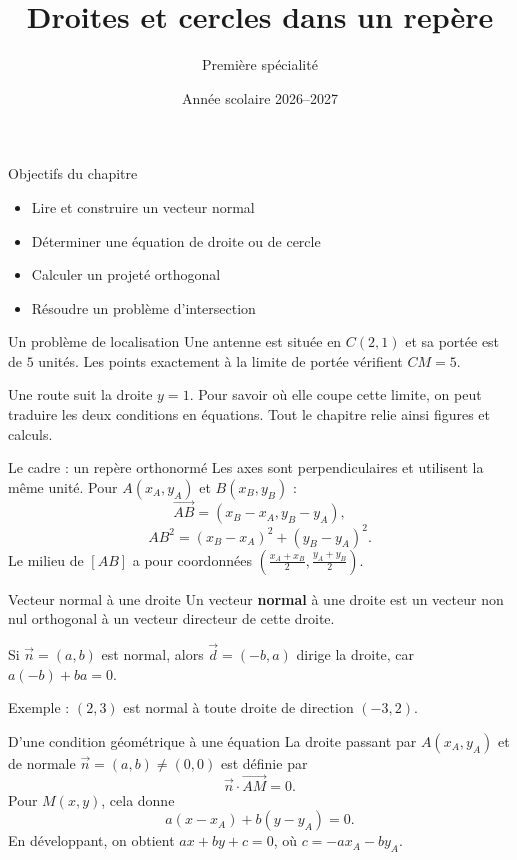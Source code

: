 \documentclass[aspectratio=169,12pt]{beamer}
\title{Droites et cercles dans un repère}
\subtitle{Première spécialité}
\date{Année scolaire 2026--2027}
\begin{document}
\begin{frame}\titlepage\end{frame}
\begin{frame}{Objectifs du chapitre}\begin{itemize}
\item Lire et construire un vecteur normal
\item Déterminer une équation de droite ou de cercle
\item Calculer un projeté orthogonal
\item Résoudre un problème d’intersection
\end{itemize}\end{frame}
\renewcommand{\slidekind}{COMPRENDRE}
\begin{frame}[t,fragile]{Un problème de localisation}
Une antenne est située en $C(2,1)$ et sa portée est de $5$ unités. Les points exactement à la limite de portée vérifient $CM=5$.\medskip\par Une route suit la droite $y=1$. Pour savoir où elle coupe cette limite, on peut traduire les deux conditions en équations. Tout le chapitre relie ainsi figures et calculs.
\end{frame}
\renewcommand{\slidekind}{COMPRENDRE}
\begin{frame}[t,fragile]{Le cadre : un repère orthonormé}
Les axes sont perpendiculaires et utilisent la même unité. Pour $A(x_A,y_A)$ et $B(x_B,y_B)$ :\[\overrightarrow{AB}=(x_B-x_A,y_B-y_A),\]\[AB^2=(x_B-x_A)^2+(y_B-y_A)^2.\]Le milieu de $[AB]$ a pour coordonnées $\left(\frac{x_A+x_B}{2},\frac{y_A+y_B}{2}\right)$.
\end{frame}
\renewcommand{\slidekind}{COMPRENDRE}
\begin{frame}[t,fragile]{Vecteur normal à une droite}
Un vecteur \textbf{normal} à une droite est un vecteur non nul orthogonal à un vecteur directeur de cette droite.\medskip\par Si $\vec n=(a,b)$ est normal, alors $\vec d=(-b,a)$ dirige la droite, car $a(-b)+ba=0$.\medskip\par Exemple : $(2,3)$ est normal à toute droite de direction $(-3,2)$.
\end{frame}
\renewcommand{\slidekind}{MÉTHODE \& EXEMPLE}
\begin{frame}[t,fragile]{D’une condition géométrique à une équation}
La droite passant par $A(x_A,y_A)$ et de normale $\vec n=(a,b)\ne(0,0)$ est définie par\[\vec n\cdot\overrightarrow{AM}=0.\]Pour $M(x,y)$, cela donne\[a(x-x_A)+b(y-y_A)=0.\]En développant, on obtient $ax+by+c=0$, où $c=-ax_A-by_A$.
\end{frame}
\end{document}

